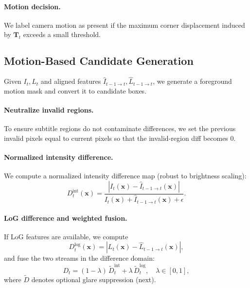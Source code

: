 \paragraph{Motion decision.}
We label camera motion as present if the maximum corner displacement induced by $\mathbf{T}_t$ exceeds a small threshold.

\subsection{Motion-Based Candidate Generation}
Given $I_t, L_t$ and aligned features $\widehat{I}_{t-1\rightarrow t}, \widehat{L}_{t-1\rightarrow t}$, we generate a foreground motion mask and convert it to candidate boxes.

\paragraph{Neutralize invalid regions.}
To ensure subtitle regions do not contaminate differences, we set the previous invalid pixels equal to current pixels so that the invalid-region diff becomes $0$.

\paragraph{Normalized intensity difference.}
We compute a normalized intensity difference map (robust to brightness scaling):
\begin{equation}
D^{\text{int}}_t(\mathbf{x})=\frac{\left|I_t(\mathbf{x})-\widehat{I}_{t-1\rightarrow t}(\mathbf{x})\right|}
{I_t(\mathbf{x})+\widehat{I}_{t-1\rightarrow t}(\mathbf{x})+\epsilon}.
\end{equation}

\paragraph{LoG difference and weighted fusion.}
If LoG features are available, we compute
\begin{equation}
D^{\text{log}}_t(\mathbf{x})=\left|L_t(\mathbf{x})-\widehat{L}_{t-1\rightarrow t}(\mathbf{x})\right|,
\end{equation}
and fuse the two streams in the difference domain:
\begin{equation}
D_t = (1-\lambda)\,\widetilde{D}^{\text{int}}_t + \lambda\,\widetilde{D}^{\text{log}}_t,\quad \lambda\in[0,1],
\end{equation}
where $\widetilde{D}$ denotes optional glare suppression (next).

